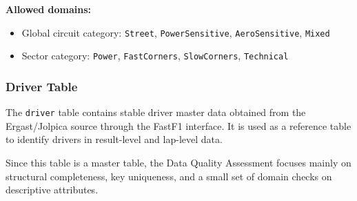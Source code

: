 \documentclass[a4paper,11pt]{article}
\begin{document}
	\textbf{Allowed domains:}
	
	\begin{itemize}[leftmargin=1.2cm]
		\item Global circuit category: \texttt{Street}, \texttt{PowerSensitive},
		\texttt{AeroSensitive}, \texttt{Mixed}
		\item Sector category: \texttt{Power}, \texttt{FastCorners},
		\texttt{SlowCorners}, \texttt{Technical}
	\end{itemize}


	\subsubsection{Driver Table}
	
	The \texttt{driver} table contains stable driver master data obtained from the
	Ergast/Jolpica source through the FastF1 interface. It is used as a reference
	table to identify drivers in result-level and lap-level data.
	
	Since this table is a master table, the Data Quality Assessment focuses mainly on
	structural completeness, key uniqueness, and a small set of domain checks on
	descriptive attributes.
	
\end{document}
